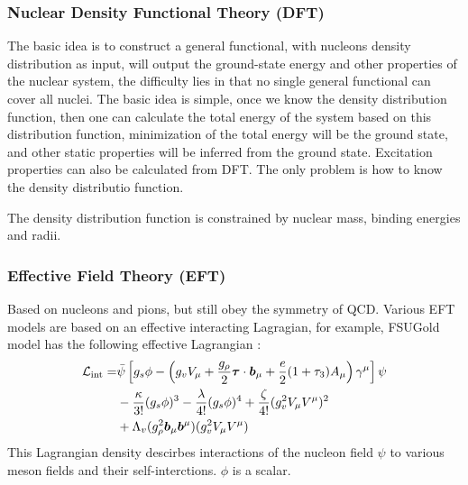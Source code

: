 \subsubsection{Nuclear Density Functional Theory (DFT)}
The basic idea is to construct a general functional, with nucleons density 
distribution as input, will output the ground-state energy and other properties
of the nuclear system, the difficulty lies in that no single general functional
can cover all nuclei.
The basic idea is simple, once we know the density distribution function, then
one can calculate the total energy of the system based on this distribution 
function, minimization of the total energy will be the ground state, and other
static properties will be inferred from the ground state. Excitation properties
can also be calculated from DFT. The only problem is how to know the density
distributio function.

The density distribution function is constrained by nuclear mass, binding energies
and radii.


\subsubsection{Effective Field Theory (EFT)}
Based on nucleons and pions, but still obey the symmetry of QCD. 
Various EFT models are based on an effective interacting Lagragian, for example,
FSUGold model has the following effective Lagrangian \cite{PhysRevLett.95.122501}:
\begin{equation}
    \begin{aligned}
	\mathcal{L}_{\text{int}} = &\bar{\psi} \left[ g_s\phi - \left( g_v V_\mu + \frac{g_\rho}{2}\boldsymbol{\tau}\cdot\boldsymbol{b}_\mu + \frac{e}{2}(1 + \tau_3) A_\mu \right)\gamma^\mu \right]\psi \\
	    & - \frac{\kappa}{3!}(g_s\phi)^3 - \frac{\lambda}{4!}(g_s\phi)^4 + \frac{\zeta}{4!}(g_v^2 V_\mu V^\mu )^2	\\
	    & + \Lambda_v(g_\rho^2\boldsymbol{b}_\mu\boldsymbol{b}^\mu)(g_v^2 V_\mu V^\mu)
    \end{aligned}
\end{equation}
This Lagrangian density descirbes interactions of the nucleon field $\psi$ to
various meson fields and their self-interctions. $\phi$ is a scalar.

